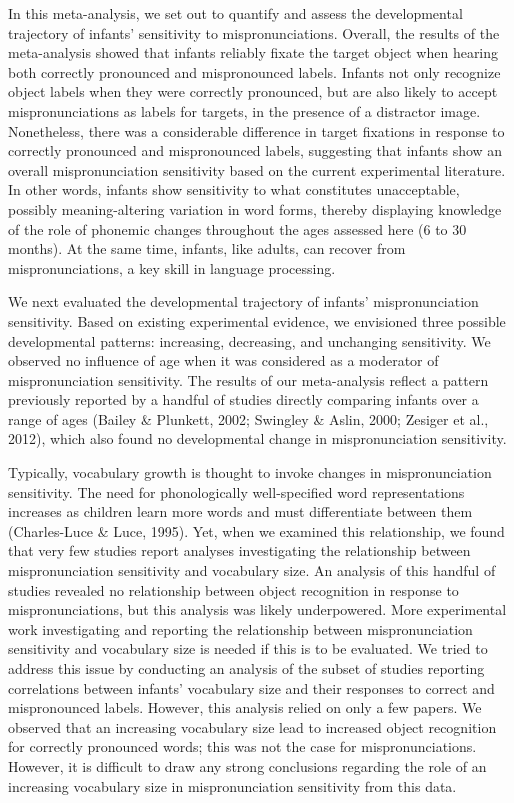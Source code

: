 \documentclass[man]{apa6}
\begin{document}
In this meta-analysis, we set out to quantify and assess the developmental trajectory of infants' sensitivity to mispronunciations. Overall, the results of the meta-analysis showed that infants reliably fixate the target object when hearing both correctly pronounced and mispronounced labels. Infants not only recognize object labels when they were correctly pronounced, but are also likely to accept mispronunciations as labels for targets, in the presence of a distractor image. Nonetheless, there was a considerable difference in target fixations in response to correctly pronounced and mispronounced labels, suggesting that infants show an overall mispronunciation sensitivity based on the current experimental literature. In other words, infants show sensitivity to what constitutes unacceptable, possibly meaning-altering variation in word forms, thereby displaying knowledge of the role of phonemic changes throughout the ages assessed here (6 to 30 months). At the same time, infants, like adults, can recover from mispronunciations, a key skill in language processing.

We next evaluated the developmental trajectory of infants' mispronunciation sensitivity. Based on existing experimental evidence, we envisioned three possible developmental patterns: increasing, decreasing, and unchanging sensitivity. We observed no influence of age when it was considered as a moderator of mispronunciation sensitivity. The results of our meta-analysis reflect a pattern previously reported by a handful of studies directly comparing infants over a range of ages (Bailey \& Plunkett, 2002; Swingley \& Aslin, 2000; Zesiger et al., 2012), which also found no developmental change in mispronunciation sensitivity.

Typically, vocabulary growth is thought to invoke changes in mispronunciation sensitivity. The need for phonologically well-specified word representations increases as children learn more words and must differentiate between them (Charles-Luce \& Luce, 1995). Yet, when we examined this relationship, we found that very few studies report analyses investigating the relationship between mispronunciation sensitivity and vocabulary size. An analysis of this handful of studies revealed no relationship between object recognition in response to mispronunciations, but this analysis was likely underpowered. More experimental work investigating and reporting the relationship between mispronunciation sensitivity and vocabulary size is needed if this is to be evaluated. We tried to address this issue by conducting an analysis of the subset of studies reporting correlations between infants' vocabulary size and their responses to correct and mispronounced labels. However, this analysis relied on only a few papers. We observed that an increasing vocabulary size lead to increased object recognition for correctly pronounced words; this was not the case for mispronunciations. However, it is difficult to draw any strong conclusions regarding the role of an increasing vocabulary size in mispronunciation sensitivity from this data.
\end{document}
